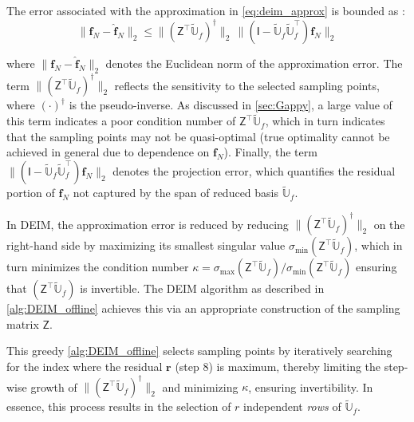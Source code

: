 \documentclass[11pt]{article}
\renewcommand{\vec}[1]{\mathbf{#1}}
\newcommand{\mat}[1]{\mathsf{#1}}
\begin{document}
        The error associated with the approximation in \cref{eq:deim_approx} is bounded as  \cite{chaturantabut2010nonlinear}:
        \begin{equation}
            \|\vec{f}_N - \widehat{\vec{f}}_N\|_2 \le \|\left(\mat{Z}^\top \widetilde{\mathbb{U}}_f\right)^{\dagger}\|_2 \, \| (\mat{I}-\widetilde{\mathbb{U}}_f\widetilde{\mathbb{U}}_f^{\top})\vec{f}_N\|_2
            \label{eq:deim_error}
        \end{equation}

        where \(\|\vec{f}_N - \widehat{\vec{f}}_N\|_2\) denotes the Euclidean norm of the approximation error.
        The term \(\|\left(\mat{Z}^\top \widetilde{\mathbb{U}}_f\right)^{\dagger}\|_2\) reflects the sensitivity to the selected sampling points, where \((\cdot)^{\dagger}\) is the pseudo-inverse.
        As discussed in \cref{sec:Gappy}, a large value of this term indicates a poor condition number of  $\mat{Z}^\top \widetilde{\mathbb{U}}_f$, which in turn indicates that the sampling points may not be quasi-optimal (true optimality cannot be achieved in general due to dependence on \(\vec{f}_N\)).
        Finally, the term \(\|(\mat{I} - \widetilde{\mathbb{U}}_f \widetilde{\mathbb{U}}_f^{\top}) \vec{f}_N\|_2\)  denotes the projection error, which quantifies the residual portion of \(\vec{f}_N\) not captured by the span of reduced basis \(\widetilde{\mathbb{U}}_f\).

        In DEIM, the approximation error is reduced by reducing  $\|\left(\mat{Z}^\top \widetilde{\mathbb{U}}_f\right)^{\dagger}\|_2$ on the right-hand side by maximizing its smallest singular value $\sigma_{\text{min}}\left(\mat{Z}^\top \widetilde{\mathbb{U}}_f\right)$, which in turn minimizes the condition number $\kappa = {\sigma_{\text{max}}\left(\mat{Z}^\top \widetilde{\mathbb{U}}_f\right)}/{\sigma_{\text{min}}\left(\mat{Z}^\top \widetilde{\mathbb{U}}_f\right)}$ ensuring that $\left(\mat{Z}^\top \widetilde{\mathbb{U}}_f \right)$ is invertible.
        The DEIM algorithm as described in \cref{alg:DEIM_offline} achieves this via an appropriate construction of the sampling matrix $\mat{Z}$.

        This greedy \cref{alg:DEIM_offline} selects sampling points by iteratively searching for the index where the residual $\vec{r}$ (step 8) is maximum, thereby limiting the step-wise growth of $\|\left(\mat{Z}^\top \widetilde{\mathbb{U}}_f\right)^{\dagger}\|_2$ and minimizing $\kappa$, ensuring invertibility.
        In essence, this process results in the selection of \( r \) independent \textit{rows} of \( \mathbb{\widetilde{U}}_f \).
\end{document}
